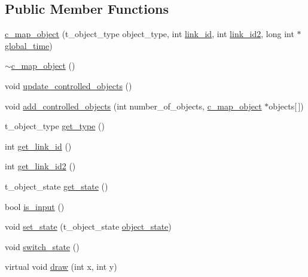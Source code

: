\subsection*{Public Member Functions}
\begin{DoxyCompactItemize}
\item 
\hyperlink{classc__map__object_af35bc3b68a2c2f756b67cc1a5b73dde3}{c\-\_\-map\-\_\-object} (t\-\_\-object\-\_\-type object\-\_\-type, int \hyperlink{classc__map__object_a4563fd9421b83b1349e4e74559b22507}{link\-\_\-id}, int \hyperlink{classc__map__object_a95575848075ef4b407907eb8e5c48e3c}{link\-\_\-id2}, long int $\ast$\hyperlink{classc__graphic__object_a9ff91aa7a60272a8f713ff011a0cc0bb}{global\-\_\-time})
\item 
\hyperlink{classc__map__object_a92cf99f145db3d9b56b94571c929564d}{$\sim$c\-\_\-map\-\_\-object} ()
\item 
void \hyperlink{classc__map__object_a1ac16227e406d56484c55089ecbffd48}{update\-\_\-controlled\-\_\-objects} ()
\item 
void \hyperlink{classc__map__object_a422769b2c8cb02575457f10113ef369c}{add\-\_\-controlled\-\_\-objects} (int number\-\_\-of\-\_\-objects, \hyperlink{classc__map__object}{c\-\_\-map\-\_\-object} $\ast$objects\mbox{[}$\,$\mbox{]})
\item 
t\-\_\-object\-\_\-type \hyperlink{classc__map__object_a29b6c2ae995c04000f76dc1e9776e3a2}{get\-\_\-type} ()
\item 
int \hyperlink{classc__map__object_afb6cfb99e3c9387c2470d94f8370ec28}{get\-\_\-link\-\_\-id} ()
\item 
int \hyperlink{classc__map__object_a138d547da618a4a3ce5e10cdb35989fd}{get\-\_\-link\-\_\-id2} ()
\item 
t\-\_\-object\-\_\-state \hyperlink{classc__map__object_a7e78aa3675f4053ec9f35730a4a8d9a4}{get\-\_\-state} ()
\item 
bool \hyperlink{classc__map__object_ab79a3d3c7a6e4a7170d8ddb7b648c782}{is\-\_\-input} ()
\item 
void \hyperlink{classc__map__object_ae16327caf95e5c4eaae2abc09a57b272}{set\-\_\-state} (t\-\_\-object\-\_\-state \hyperlink{classc__map__object_a8bde4cfd4fed11a9f01389977504a10a}{object\-\_\-state})
\item 
void \hyperlink{classc__map__object_acf08ee03ad8b6751611800aa57b190bd}{switch\-\_\-state} ()
\item 
virtual void \hyperlink{classc__map__object_add8a45bcf4f77ba65716095c05483f4f}{draw} (int x, int y)
\item 

\end{DoxyCompactItemize}
